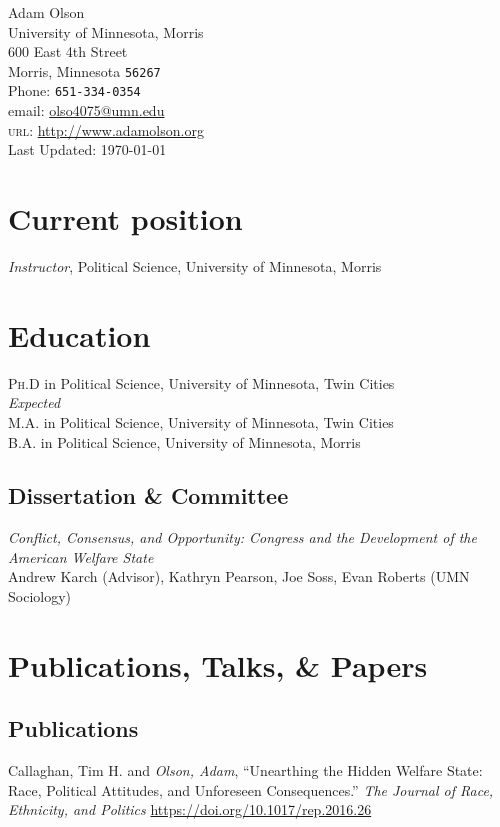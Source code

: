 \documentclass[12pt, letter]{article}
\newcommand{\years}[1]{\marginnote{\normalsize #1}}
\begin{document}
{\LARGE Adam Olson}\\[1cm]
University of Minnesota, Morris\\
600 East 4th Street \\
Morris, Minnesota \texttt{56267} \\[.2cm]
Phone: \texttt{651-334-0354}\\
email: \href{mailto:olso4075@umn.edu}{olso4075@umn.edu}\\
\textsc{url}: \href{http://www.adamolson.org}{http://www.adamolson.org} \\
Last Updated:  \today

\section*{Current position}
\emph{Instructor}, Political Science, University of Minnesota, Morris

\section*{Education}
\noindent
\years{2017}\textsc{Ph.D} in Political Science, University of Minnesota, Twin Cities\\
\textit{Expected}\\
\years{2014}\textsc{M.A.} in Political Science, University of Minnesota, Twin Cities\\
\years{2010}\textsc{B.A.} in Political Science, University of Minnesota, Morris

\subsection*{Dissertation \& Committee}
\emph{Conflict, Consensus, and Opportunity: Congress and the Development of the American Welfare State} \\
Andrew Karch (Advisor), Kathryn Pearson, Joe Soss, Evan Roberts (UMN Sociology)

\section*{Publications, Talks, \& Papers}
\subsection*{Publications}
\noindent
\years{2017}Callaghan, Tim H. and \emph{Olson, Adam}, ``Unearthing the Hidden Welfare State: Race, Political Attitudes, and Unforeseen Consequences.'' \textit{The Journal of Race, Ethnicity, and Politics} \url{https://doi.org/10.1017/rep.2016.26} \\
\end{document}
